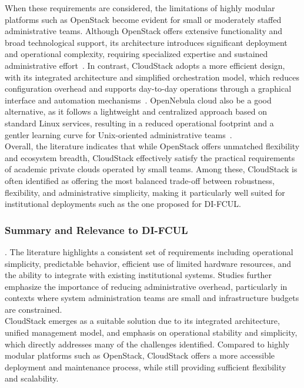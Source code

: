 \documentclass[sigplan]{acmart}
\begin{document}
            When these requirements are considered, the limitations of highly modular platforms such as OpenStack become evident for small or moderately staffed administrative teams. Although OpenStack offers extensive functionality and broad technological support, its architecture introduces significant deployment and operational complexity, requiring specialized expertise and sustained administrative effort~\cite{lynnComparativeStudyCurrent2015, barkatOpenSourceSolutions2015}. In contrast, CloudStack adopts a more efficient design, with its integrated architecture and simplified orchestration model, which reduces configuration overhead and supports day-to-day operations through a graphical interface and automation mechanisms~\cite{vogelPrivateIaaSClouds2016, oleksiukExperienceMaintenanceAcademic2021}. OpenNebula cloud also be a good alternative, as it follows a lightweight and centralized approach based on standard Linux services, resulting in a reduced operational footprint and a gentler learning curve for Unix-oriented administrative teams~\cite{oleksiukComparativeStudySupport2021}.\\

            Overall, the literature indicates that while OpenStack offers unmatched flexibility and ecosystem breadth, CloudStack effectively satisfy the practical requirements of academic private clouds operated by small teams. Among these, CloudStack is often identified as offering the most balanced trade-off between robustness, flexibility, and administrative simplicity, making it particularly well suited for institutional deployments such as the one proposed for DI-FCUL.
        
        \subsubsection{Summary and Relevance to DI-FCUL}\label{sec:related.summary}.
            The literature highlights a consistent set of requirements including operational simplicity, predictable behavior, efficient use of limited hardware resources, and the ability to integrate with existing institutional systems. Studies further emphasize the importance of reducing administrative overhead, particularly in contexts where system administration teams are small and infrastructure budgets are constrained.\\

            CloudStack emerges as a suitable solution due to its integrated architecture, unified management model, and emphasis on operational stability and simplicity, which directly addresses many of the challenges identified. Compared to highly modular platforms such as OpenStack, CloudStack offers a more accessible deployment and maintenance process, while still providing sufficient flexibility and scalability.\\
            
\end{document}
